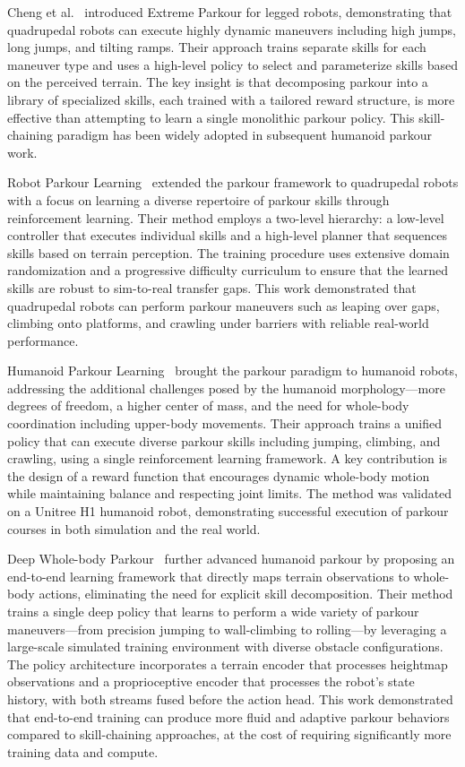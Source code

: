 Cheng et al.~\cite{cheng2024extremeparkour} introduced Extreme Parkour for legged robots, demonstrating that quadrupedal robots can execute highly dynamic maneuvers including high jumps, long jumps, and tilting ramps. Their approach trains separate skills for each maneuver type and uses a high-level policy to select and parameterize skills based on the perceived terrain. The key insight is that decomposing parkour into a library of specialized skills, each trained with a tailored reward structure, is more effective than attempting to learn a single monolithic parkour policy. This skill-chaining paradigm has been widely adopted in subsequent humanoid parkour work.

Robot Parkour Learning~\cite{zhuang2024robotparkour} extended the parkour framework to quadrupedal robots with a focus on learning a diverse repertoire of parkour skills through reinforcement learning. Their method employs a two-level hierarchy: a low-level controller that executes individual skills and a high-level planner that sequences skills based on terrain perception. The training procedure uses extensive domain randomization and a progressive difficulty curriculum to ensure that the learned skills are robust to sim-to-real transfer gaps. This work demonstrated that quadrupedal robots can perform parkour maneuvers such as leaping over gaps, climbing onto platforms, and crawling under barriers with reliable real-world performance.

Humanoid Parkour Learning~\cite{zhuang2024humanoidparkour} brought the parkour paradigm to humanoid robots, addressing the additional challenges posed by the humanoid morphology---more degrees of freedom, a higher center of mass, and the need for whole-body coordination including upper-body movements. Their approach trains a unified policy that can execute diverse parkour skills including jumping, climbing, and crawling, using a single reinforcement learning framework. A key contribution is the design of a reward function that encourages dynamic whole-body motion while maintaining balance and respecting joint limits. The method was validated on a Unitree H1 humanoid robot, demonstrating successful execution of parkour courses in both simulation and the real world.

Deep Whole-body Parkour~\cite{zhuang2024deepwholebody} further advanced humanoid parkour by proposing an end-to-end learning framework that directly maps terrain observations to whole-body actions, eliminating the need for explicit skill decomposition. Their method trains a single deep policy that learns to perform a wide variety of parkour maneuvers---from precision jumping to wall-climbing to rolling---by leveraging a large-scale simulated training environment with diverse obstacle configurations. The policy architecture incorporates a terrain encoder that processes heightmap observations and a proprioceptive encoder that processes the robot's state history, with both streams fused before the action head. This work demonstrated that end-to-end training can produce more fluid and adaptive parkour behaviors compared to skill-chaining approaches, at the cost of requiring significantly more training data and compute.


